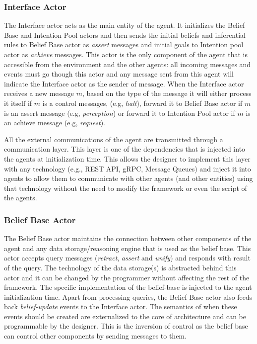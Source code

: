 \subsubsection{Interface Actor}
The Interface actor acts as the main entity of the agent. It initializes the Belief Base and Intention Pool actors and then sends the initial beliefs and inferential rules to Belief Base actor as \textit{assert} messages and initial goals to Intention pool actor as \textit{achieve} messages. This actor is the only component of the agent that is accessible from the environment and the other agents: all incoming messages and events must go though this actor and any message sent from this agent will indicate the Interface actor as the sender of message. When the Interface actor receives a new message $m$, based on the type of the message it will either process it itself if $m$ is a control messages, (e.g, \textit{halt}), forward it to Belief Base actor if $m$ is an assert message (e.g, \textit{perception}) or forward it to Intention Pool actor if $m$ is an achieve message (e.g, \textit{request}).

All the external communications of the agent are transmitted through a communication layer. This layer is one of the dependencies that is injected into the agents at initialization time. This allows the designer to implement this layer with any technology (e.g., REST API, gRPC, Message Queues) and inject it into agents to allow them to communicate with other agents (and other entities) using that technology without the need to modify the framework or even the script of the agents.

\subsubsection{Belief Base Actor}
The Belief Base actor maintains the connection between other components of the agent and any data storage/reasoning engine that is used as the belief base. This actor accepts query messages (\textit{retract}, 
\textit{assert} and \textit{unify}) and responds with result of the query. The technology of the data storage(s) is abstracted behind this actor and it can be changed by the programmer without affecting the rest of the framework. The specific implementation of the belief-base is injected to the agent initialization time. %
Apart from processing queries, the Belief Base actor also feeds back \textit{belief-update} events to the Interface actor. The semantics of when these events should be created are externalized to the core of architecture and can be programmable by the designer. This is the inversion of control as the belief base can control other components by sending messages to them.

